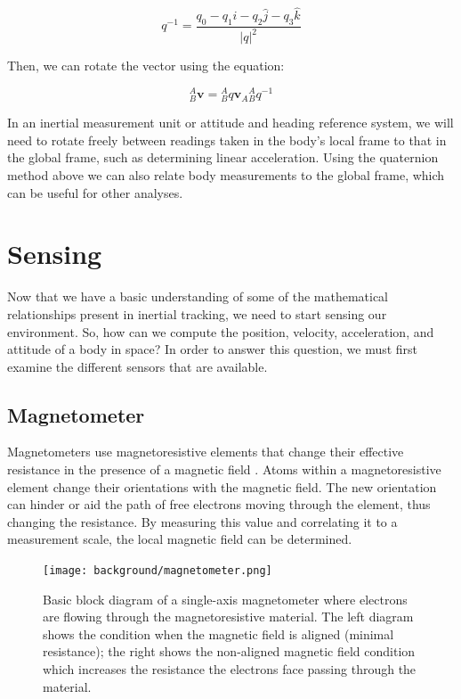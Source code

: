 \begin{equation}
    q^{-1} = \frac{q_0 - q_1\hat{i} - q_2\hat{j} - q_3\hat{k}}{|q|^2}
\end{equation}

Then, we can rotate the vector using the equation:

\begin{equation}
    {}^A_B \pmb{v} = {}^A_Bq \pmb{v}_A {}^A_Bq^{-1}
\end{equation}

In an inertial measurement unit or attitude and heading reference system, we will need to rotate freely between readings taken in the body's local frame to that in the global frame, such as determining linear acceleration.
Using the quaternion method above we can also relate body measurements to the global frame, which can be useful for other analyses.

\section{Sensing} 
Now that we have a basic understanding of some of the mathematical relationships present in inertial tracking, we need to start sensing our environment.
So, how can we compute the position, velocity, acceleration, and attitude of a body in space?
In order to answer this question, we must first examine the different sensors that are available.

\subsection{Magnetometer} 
Magnetometers use magnetoresistive elements that change their effective resistance in the presence of a magnetic field \cite{Corke:2011}.
Atoms within a magnetoresistive element change their orientations with the magnetic field.
The new orientation can hinder or aid the path of free electrons moving through the element, thus changing the resistance.
By measuring this value and correlating it to a measurement scale, the local magnetic field can be determined.

\begin{figure}[h!]
    \caption[Magnetometer block diagram]{Basic block diagram of a single-axis magnetometer where electrons are flowing through the magnetoresistive material. The left diagram shows the condition when the magnetic field is aligned (minimal resistance); the right shows the non-aligned magnetic field condition which increases the resistance the electrons face passing through the material.}
    \centering
    \texttt{[image: background/magnetometer.png]}
\end{figure}

